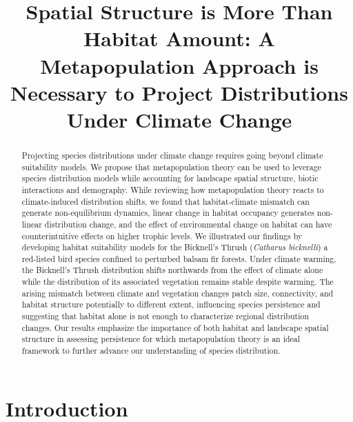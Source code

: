\documentclass[12pt]{article}
\title{Spatial Structure is More Than Habitat Amount: A Metapopulation
Approach is Necessary to Project Distributions Under Climate Change}
\date{}
\begin{document}
\maketitle
\begin{abstract}
Projecting species distributions under climate change requires going
beyond climate suitability models. We propose that metapopulation theory
can be used to leverage species distribution models while accounting for
landscape spatial structure, biotic interactions and demography. While
reviewing how metapopulation theory reacts to climate-induced
distribution shifts, we found that habitat-climate mismatch can generate
non-equilibrium dynamics, linear change in habitat occupancy generates
non-linear distribution change, and the effect of environmental change
on habitat can have counterintuitive effects on higher trophic levels.
We illustrated our findings by developing habitat suitability models for
the Bicknell's Thrush (\emph{Catharus bicknelli}) a red-listed bird
species confined to perturbed balsam fir forests. Under climate warming,
the Bicknell's Thrush distribution shifts northwards from the effect of
climate alone while the distribution of its associated vegetation
remains stable despite warming. The arising mismatch between climate and
vegetation changes patch size, connectivity, and habitat structure
potentially to different extent, influencing species persistence and
suggesting that habitat alone is not enough to characterize regional
distribution changes. Our results emphasize the importance of both
habitat and landscape spatial structure in assessing persistence for
which metapopulation theory is an ideal framework to further advance our
understanding of species distribution.
\end{abstract}
\newpage



\hypertarget{introduction}{%
\section{Introduction}\label{introduction}}
\end{document}
